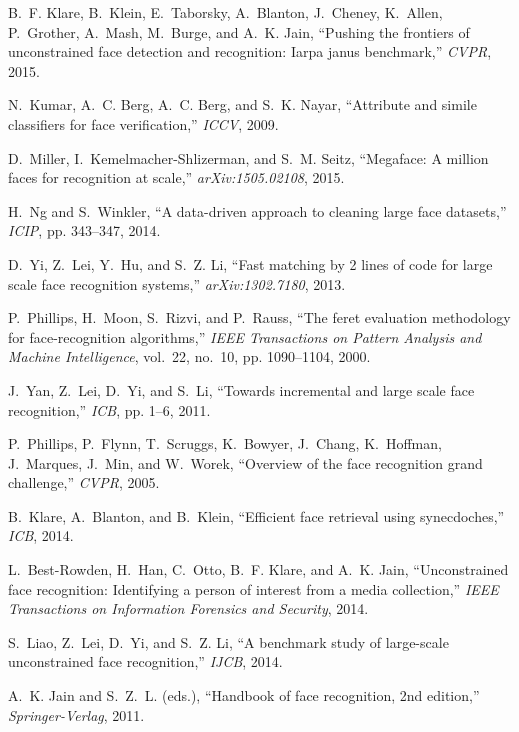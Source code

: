 \documentclass[10pt,journal,compsoc]{IEEEtran}
\begin{document}
\begin{thebibliography}{10}
B.~F. Klare, B.~Klein, E.~Taborsky, A.~Blanton, J.~Cheney, K.~Allen,
  P.~Grother, A.~Mash, M.~Burge, and A.~K. Jain, ``Pushing the frontiers of
  unconstrained face detection and recognition: Iarpa janus benchmark,''
  \emph{CVPR}, 2015.

N.~Kumar, A.~C. Berg, A.~C. Berg, and S.~K. Nayar, ``Attribute and simile
  classifiers for face verification,'' \emph{ICCV}, 2009.

D.~Miller, I.~Kemelmacher-Shlizerman, and S.~M. Seitz, ``Megaface: A million
  faces for recognition at scale,'' \emph{arXiv:1505.02108}, 2015.

H.~Ng and S.~Winkler, ``A data-driven approach to cleaning large face
  datasets,'' \emph{ICIP}, pp. 343--347, 2014.

D.~Yi, Z.~Lei, Y.~Hu, and S.~Z. Li, ``Fast matching by 2 lines of code for
  large scale face recognition systems,'' \emph{arXiv:1302.7180}, 2013.

P.~Phillips, H.~Moon, S.~Rizvi, and P.~Rauss, ``The feret evaluation
  methodology for face-recognition algorithms,'' \emph{IEEE Transactions on
  Pattern Analysis and Machine Intelligence}, vol.~22, no.~10, pp. 1090--1104,
  2000.

J.~Yan, Z.~Lei, D.~Yi, and S.~Li, ``Towards incremental and large scale face
  recognition,'' \emph{ICB}, pp. 1--6, 2011.

P.~Phillips, P.~Flynn, T.~Scruggs, K.~Bowyer, J.~Chang, K.~Hoffman, J.~Marques,
  J.~Min, and W.~Worek, ``Overview of the face recognition grand challenge,''
  \emph{CVPR}, 2005.

B.~Klare, A.~Blanton, and B.~Klein, ``Efficient face retrieval using
  synecdoches,'' \emph{ICB}, 2014.

L.~Best-Rowden, H.~Han, C.~Otto, B.~F. Klare, and A.~K. Jain, ``Unconstrained
  face recognition: Identifying a person of interest from a media collection,''
  \emph{IEEE Transactions on Information Forensics and Security}, 2014.

S.~Liao, Z.~Lei, D.~Yi, and S.~Z. Li, ``A benchmark study of large-scale
  unconstrained face recognition,'' \emph{IJCB}, 2014.

A.~K. Jain and S.~Z.~L. (eds.), ``Handbook of face recognition, 2nd edition,''
  \emph{Springer-Verlag}, 2011.


\end{thebibliography}
\end{document}

